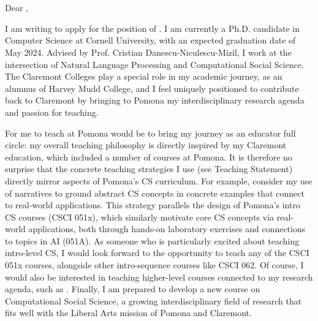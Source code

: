 \documentclass[12pt]{letter}
\begin{document}
\signature{Jonathan P. Chang}
\begin{letter}{
\department \\
\schoolnamelong \\
\schooladdress
}

\opening{
    Dear ,
}

I am writing to apply for the position of \position.
I am currently a Ph.D. candidate in Computer Science at Cornell University, with an expected graduation date of May 2024.
Advised by Prof. Cristian Danescu-Niculescu-Mizil, I work at the intersection of Natural Language Processing and Computational Social Science.
The Claremont Colleges play a special role in my academic journey, as an alumnus of Harvey Mudd College, and I feel uniquely positioned to contribute back to Claremont by bringing to Pomona my interdisciplinary research agenda and passion for teaching.

For me to teach at Pomona would be to bring my journey as an educator full circle: my overall teaching philosophy is directly inspired by my Claremont education, which included a number of courses at Pomona.
It is therefore no surprise that the concrete teaching strategies I use (see Teaching Statement) directly mirror aspects of Pomona's CS curriculum.
For example, consider my use of narratives to ground abstract CS concepts in concrete examples that connect to real-world applications.
This strategy parallels the design of Pomona's intro CS courses (CSCI 051x), which similarly motivate core CS concepts via real-world applications, both through hands-on laboratory exercises and connections to topics in AI (051A).
As someone who is particularly excited about teaching intro-level CS, I would look forward to the opportunity to teach any of the CSCI 051x courses, alongside other intro-sequence courses like CSCI 062.
Of course, I would also be interested in teaching higher-level courses connected to my research agenda, such as \schooladvcourses.
Finally, I am prepared to develop a new course on Computational Social Science, a growing interdisciplinary field of research that fits well with the Liberal Arts mission of Pomona and Claremont.


\end{letter}
\end{document}
